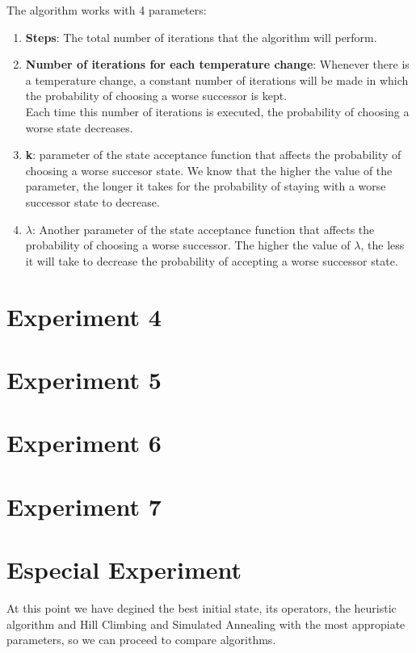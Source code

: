 \documentclass[12]{article}
\begin{document}
The algorithm works with 4 parameters:
\begin{enumerate}
\item \textbf{Steps}: The total number of iterations that the algorithm will perform. 
\item \textbf{Number of iterations for each temperature change}: Whenever there is a temperature change, a constant number of iterations will be made in which the probability of choosing a worse successor is kept. 
\\
Each time this number of iterations is executed, the probability of choosing a worse state decreases. 
\item \textbf{k}: parameter of the state acceptance function that affects the probability of choosing a worse succesor state. We know that the higher the value of the parameter, the longer it takes for the probability of staying with a worse successor state to decrease. 

\item \textbf{$\lambda$}: Another parameter of the state acceptance function that affects the probability of choosing a worse successor. The higher the value of $\lambda$, the less it will take to decrease the probability of accepting a worse successor state. 


\end{enumerate}

\section{Experiment 4}



\section{Experiment 5}


\section{Experiment 6}


\section{Experiment 7}


\section{Especial Experiment}

At this point we have degined the best initial state, its operators, the heuristic algorithm and Hill Climbing and Simulated Annealing with the most appropiate parameters, so we can proceed to compare algorithms. 
\end{document}

